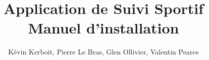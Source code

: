 \documentclass[french,12pt]{article}
\author{Kévin Kerboit, Pierre Le Bras, Glen Ollivier, Valentin Pearce}
\begin{document}
\title{Application de Suivi Sportif \\ Manuel d'installation}
\maketitle
\end{document}
